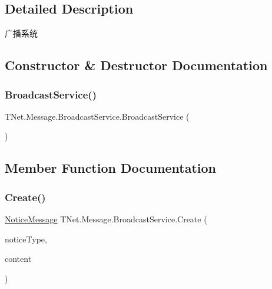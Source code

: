 \subsection{Detailed Description}
广播系统 



\subsection{Constructor \& Destructor Documentation}
\mbox{\label{class_t_net_1_1_message_1_1_broadcast_service_af3378690a5b7dc64ad09e983c5b72b40}} 
\subsubsection{\texorpdfstring{Broadcast\+Service()}{BroadcastService()}}
{\footnotesize\ttfamily T\+Net.\+Message.\+Broadcast\+Service.\+Broadcast\+Service (\begin{DoxyParamCaption}{ }\end{DoxyParamCaption})\hspace{0.3cm}{\ttfamily [protected]}}







\subsection{Member Function Documentation}
\mbox{\label{class_t_net_1_1_message_1_1_broadcast_service_a7cfb5cab46ef3ea185f756ef6f7775ae}} 
\subsubsection{\texorpdfstring{Create()}{Create()}\hspace{0.1cm}{\footnotesize\ttfamily [1/2]}}
{\footnotesize\ttfamily \mbox{\hyperlink{class_t_net_1_1_message_1_1_notice_message}{Notice\+Message}} T\+Net.\+Message.\+Broadcast\+Service.\+Create (\begin{DoxyParamCaption}\item[{\mbox{\hyperlink{namespace_t_net_1_1_model_a84a982245a4f84ccbdcd9cb3763269b6}{Notice\+Type}}}]{notice\+Type,  }\item[{string}]{content }\end{DoxyParamCaption})}




